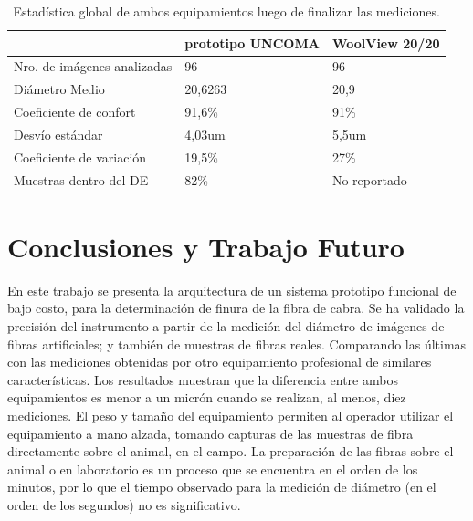 \documentclass[runningheads,a4paper]{llncs}
\begin{document}
\begin{table}[htbp]
\begin{center}
\begin{tabular}{|l|l|l|}
\hline
& prototipo UNCOMA & WoolView 20/20 \\
\hline \hline \hline
Nro. de imágenes analizadas & 96 & 96 \\ \hline
Diámetro Medio & 20,6263 & 20,9 \\ \hline
Coeficiente de confort & 91,6\% & 91\% \\ \hline
Desvío estándar & 4,03um & 5,5um \\ \hline
Coeficiente de variación & 19,5\% & 27\% \\ \hline
Muestras dentro del DE & 82\% & No reportado \\ \hline
\end{tabular}
\caption{Estadística global de ambos equipamientos luego de finalizar las mediciones.}
\label{tabla:sencilla}
\end{center}
\end{table}


\section{Conclusiones y Trabajo Futuro} \label{sec:conc}
En este trabajo se presenta la arquitectura de un sistema prototipo funcional
de bajo costo, para la determinación de finura de la fibra de cabra.
Se ha validado la precisión del instrumento a partir de  la medición
del diámetro de imágenes de fibras artificiales; y también de 
muestras de fibras reales. Comparando las últimas  con las mediciones 
obtenidas por otro equipamiento profesional de similares características. Los resultados
muestran que la diferencia entre ambos equipamientos es menor a un micrón cuando se realizan, al menos, diez mediciones.
El peso y tamaño del equipamiento permiten al operador 
utilizar el equipamiento a mano alzada, tomando capturas de las muestras 
de fibra directamente sobre el animal, en el campo.
La preparación de las fibras sobre el animal o en laboratorio es un proceso que se encuentra en el orden de 
los minutos, por lo que el tiempo observado para la medición de diámetro 
(en el orden de los segundos) no es significativo.
\end{document}
